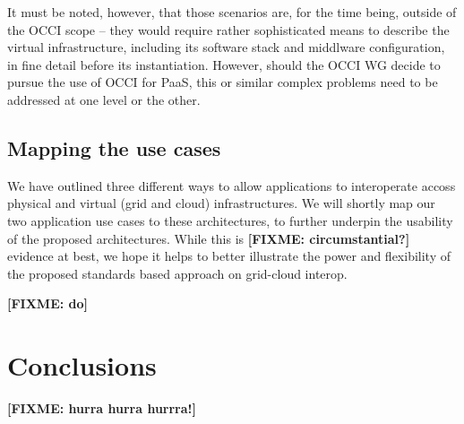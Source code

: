 \documentclass[10pt,conference,final,letterpaper,twoside,twocolumn,]{IEEEtran}
\newcommand{\B}[1]{\textbf{#1}}
\newcommand{\F}[1]{\B{[FIXME: #1]}}
\begin{document}
 It must be noted, however, that those scenarios are, for the time
 being, outside of the OCCI scope -- they would require rather
 sophisticated means to describe the virtual infrastructure, including
 its software stack and middlware configuration, in fine detail before
 its instantiation.  However, should the OCCI WG decide to pursue the
 use of OCCI for PaaS, this or similar complex problems need to be
 addressed at one level or the other.


 \subsection{Mapping the use cases}

 We have outlined three different ways to allow applications to
 interoperate accoss physical and virtual (grid and cloud)
 infrastructures.  We will shortly map our two application use cases
 to these architectures, to further underpin the usability of the
 proposed architectures.  While this is \F{circumstantial?} evidence
 at best, we hope it helps to better illustrate the power and
 flexibility of the proposed standards based approach on grid-cloud
 interop.

 \F{do}


\section{Conclusions}
\label{sec:conc}

 \F{hurra hurra hurrra!}




\end{document}

